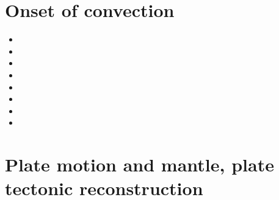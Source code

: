 \section{Onset of convection}

\begin{scriptsize}
\begin{itemize}
\item[\nineteeneightytwo] 
\item[\nineteenninety] 
\item[\twothousand] 
\item[\twothousandsix] 
\item[\twothousandtwo] 
\item[\twothousandtwo] 
\item[\twothousandseven] 
\item[\twothousandfifteen] 
\end{itemize}
\end{scriptsize}

\section{Plate motion and mantle, plate tectonic reconstruction}

